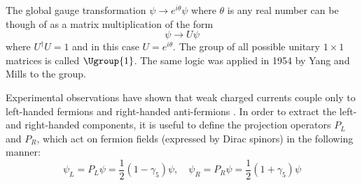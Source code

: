 The global gauge transformation $\psi\rightarrow e^{i\theta}\psi$ where $\theta$ is any real number can be though of as a matrix multiplication of the form
\begin{equation}
    \psi\rightarrow U\psi
\end{equation}
where $U^{\dag}U=1$ and in this case $U=e^{i\theta}$. The group of all possible unitary $1\times1$ matrices is called $\Ugroup{1}$. The same logic was applied in 1954 by Yang and Mills to the  group.


Experimental observations have shown that weak charged currents couple only to left-handed fermions and right-handed anti-fermions \cite{Pich:2007vu}. In order to extract the left- and right-handed components, it is useful to define the projection operators $P_L$ and $P_R$, which act on fermion fields (expressed by Dirac spinors) in the following manner:
\begin{equation}
    \psi_{L}=P_{L}\psi=\dfrac{1}{2}(1- \gamma_5)\psi,\quad 
    \psi_{R}=P_{R}\psi=\dfrac{1}{2}(1+ \gamma_5)\psi
\end{equation}

